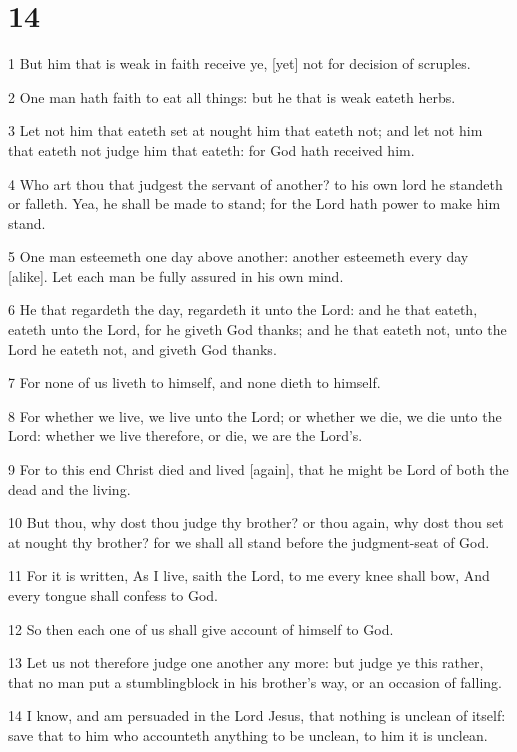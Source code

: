 \chapter{14}

\par 1 But him that is weak in faith receive ye, [yet] not for decision of scruples.
\par 2 One man hath faith to eat all things: but he that is weak eateth herbs.
\par 3 Let not him that eateth set at nought him that eateth not; and let not him that eateth not judge him that eateth: for God hath received him.
\par 4 Who art thou that judgest the servant of another? to his own lord he standeth or falleth. Yea, he shall be made to stand; for the Lord hath power to make him stand.
\par 5 One man esteemeth one day above another: another esteemeth every day [alike]. Let each man be fully assured in his own mind.
\par 6 He that regardeth the day, regardeth it unto the Lord: and he that eateth, eateth unto the Lord, for he giveth God thanks; and he that eateth not, unto the Lord he eateth not, and giveth God thanks.
\par 7 For none of us liveth to himself, and none dieth to himself.
\par 8 For whether we live, we live unto the Lord; or whether we die, we die unto the Lord: whether we live therefore, or die, we are the Lord's.
\par 9 For to this end Christ died and lived [again], that he might be Lord of both the dead and the living.
\par 10 But thou, why dost thou judge thy brother? or thou again, why dost thou set at nought thy brother? for we shall all stand before the judgment-seat of God.
\par 11 For it is written, As I live, saith the Lord, to me every knee shall bow, And every tongue shall confess to God.
\par 12 So then each one of us shall give account of himself to God.
\par 13 Let us not therefore judge one another any more: but judge ye this rather, that no man put a stumblingblock in his brother's way, or an occasion of falling.
\par 14 I know, and am persuaded in the Lord Jesus, that nothing is unclean of itself: save that to him who accounteth anything to be unclean, to him it is unclean.
